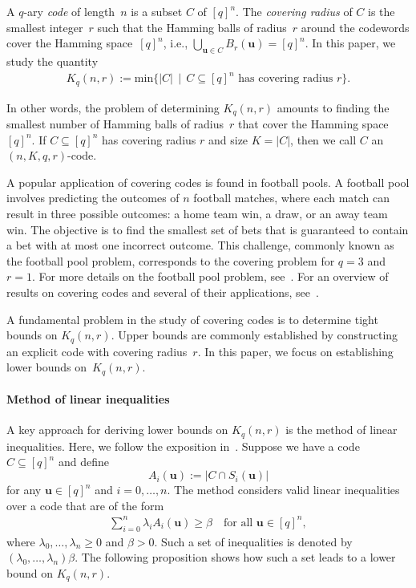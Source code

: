 \documentclass[10pt,a4paper]{article}
\theoremstyle{definition}
\newcommand{\uu}{\mathbf{u}}
\begin{document}
A $q$-ary \emph{code} of length~$n$ is a subset $C$ of $[q]^n$. The \emph{covering radius} of $C$ is the smallest integer~$r$ such that the Hamming balls of radius~$r$ around the codewords cover the Hamming space~$[q]^n$, i.e., $\bigcup_{\uu \in C} B_r(\uu) = [q]^n$. In this paper, we study the quantity 
\begin{align}
    K_q(n,r) := \text{min}\{ |C| \, \mid \, C \subseteq [q]^n \text{ has covering radius~$r$} \}. 
\end{align}

In other words, the problem of determining $K_q(n,r)$ amounts to finding the
smallest number of Hamming balls of radius~$r$ that cover the Hamming space~$[q]^n$. If $C\subseteq [q]^n$ has covering radius $r$ and size $K=|C|$, then we call $C$ an $(n,K,q,r)$-code. 

A popular application of covering codes is found in football pools. A football pool involves predicting the outcomes of $n$ football matches, where each match can result in three possible outcomes: a home team win, a draw, or an away team win. The objective is to find the smallest set of bets that is guaranteed to contain a bet with at most one incorrect outcome. This challenge, commonly known as the football pool problem, corresponds to the covering problem for $q = 3$ and $r = 1$.  For more details on the football pool problem, see~\cite{H95}. For an overview of results on covering codes and several of their applications, see~\cite{CHLL97}.

A fundamental problem in the study of covering codes is to determine tight bounds on $K_q(n,r)$. Upper bounds are commonly established by constructing an explicit code with covering radius~$r$. In this paper, we focus on establishing lower bounds on~$K_q(n,r)$.

\paragraph{Method of linear inequalities}
A key approach for deriving lower bounds on $K_q(n, r)$ is the method of linear inequalities. Here, we follow the exposition in~\cite[Chapter 6]{CHLL97}. Suppose we have a code $C \subseteq [q]^n $ and define  
\[
A_i(\uu) := |C \cap S_i(\uu)|  
\]
for any $\uu \in [q]^n$ and $i = 0, \ldots, n$. The method considers valid linear inequalities over a code that are of the form 
\begin{align}\label{eq:lineqofcode}
\sum_{i=0}^n \lambda_i A_i(\uu) \geq \beta \quad \text{for all } \uu \in [q]^n,  
\end{align}
where $\lambda_0, \ldots, \lambda_n \geq 0$ and $\beta > 0$. Such a set of inequalities is denoted by $(\lambda_0, \ldots, \lambda_n) \beta$. The following proposition shows how such a set leads to a lower bound on $ K_q(n, r) $.
\end{document}
